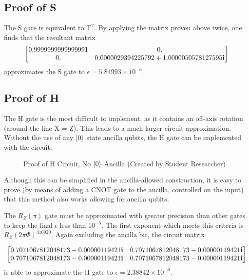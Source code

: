 \documentclass[12pt]{article}
\begin{document}
\subsection{Proof of S}
The S gate is equivalent to $\text{T}^2$. By applying the matrix proven above twice, one finds that the resultant matrix
$$
\scalebox{1}{$
\begin{bmatrix}
    0.9999999999999991&0.\\
    0.&0.0000029394225792 + 1.0000050578127595\mathbf{i}
\end{bmatrix}
$}
$$
approximates the S gate to $\epsilon = 5.84993 \times 10^{-6}$.

\subsection{Proof of H}
The H gate is the most difficult to implement, as it contains an off-axis rotation (around the line X = Z). This leads to a much larger circuit approximation. Without the use of any $\ket{0}$ state ancilla qubits, the H gate can be implemented with the circuit:
\begin{figure}[h]
    \centering
    \caption{Proof of H Circuit, No $\ket{0}$ Ancilla (Created by Student Researcher)}
    \label{fig:quantum universal set 1 proof of T circuit}
\end{figure}

Although this can be simplified in the ancilla-allowed construction, it is easy to prove (by means of adding a CNOT gate to the ancilla, controlled on the input) that this method also works allowing for ancilla qubits.

The $R_Z(\pi)$ gate must be approximated with greater precision than other gates to keep the final $\epsilon$ less than $10^{-5}$. The first exponent which meets this criteria is $R_Z(2\pi \Phi)^{416020}$. Again excluding the ancilla bit, the circuit matrix

$$
\scalebox{1}{$
\begin{bmatrix}
    0.7071067812048173-0.00000119421\mathbf{i}&0.7071067812048173-0.00000119421\mathbf{i}\\
    0.7071067812048173-0.00000119421\mathbf{i}&0.7071067812048173-0.00000119421\mathbf{i}
\end{bmatrix}
$}
$$
is able to approximate the H gate to $\epsilon = 2.38842 \times 10^{-6}$.
\end{document}
